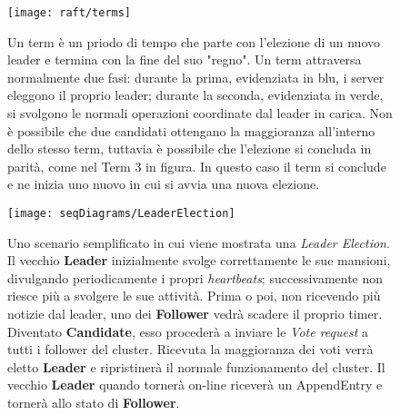 \begin{figure}[H]
	\centering
	\texttt{[image: raft/terms]}
	\caption{Un term è un priodo di tempo che parte con l'elezione di un nuovo leader e termina con la fine del suo "regno". 
		Un term attraversa normalmente due fasi: durante la prima, evidenziata in blu, i server eleggono il proprio leader; durante la seconda, evidenziata in verde, si svolgono le normali operazioni coordinate dal leader in carica.
		Non è possibile che due candidati ottengano la maggioranza all'interno dello stesso term, tuttavia è possibile che l'elezione si concluda in parità, come nel Term 3 in figura. In questo caso il term si conclude e ne inizia uno nuovo in cui si avvia una nuova elezione.}
	\label{fig:figure3}
\end{figure}


\begin{figure}[H]
	\centering
	\texttt{[image: seqDiagrams/LeaderElection]}
	\caption{Uno scenario semplificato in cui viene mostrata una \textit{Leader Election}. Il vecchio \textbf{Leader} inizialmente svolge correttamente le sue mansioni, divulgando periodicamente i propri \textit{heartbeats}; successivamente non riesce più a svolgere le sue attività. Prima o poi, non ricevendo più notizie dal leader, uno dei \textbf{Follower} vedrà scadere il proprio timer. Diventato \textbf{Candidate}, esso procederà a inviare le \textit{Vote request} a tutti i follower del cluster. Ricevuta la maggioranza dei voti verrà eletto \textbf{Leader} e ripristinerà il normale funzionamento del cluster. Il vecchio \textbf{Leader} quando tornerà on-line riceverà un AppendEntry e tornerà allo stato di \textbf{Follower}.}
	\label{fig:figure4}
\end{figure}


